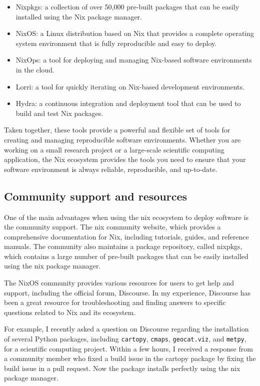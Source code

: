 \documentclass[
]{article}
\begin{document}
\begin{itemize}
\item
  Nixpkgs: a collection of over 50,000 pre-built packages that can be easily installed using the Nix package manager.
\item
  NixOS: a Linux distribution based on Nix that provides a complete operating system environment that is fully reproducible and easy to deploy.
\item
  NixOps: a tool for deploying and managing Nix-based software environments in the cloud.
\item
  Lorri: a tool for quickly iterating on Nix-based development environments.
\item
  Hydra: a continuous integration and deployment tool that can be used to build and test Nix packages.
\end{itemize}

Taken together, these tools provide a powerful and flexible set of tools for creating and managing reproducible software environments. Whether you are working on a small research project or a large-scale scientific computing application, the Nix ecosystem provides the tools you need to ensure that your software environment is always reliable, reproducible, and up-to-date.

\hypertarget{community-support-and-resources}{%
\subsection{Community support and resources}\label{community-support-and-resources}}

One of the main advantages when using the nix ecosystem to deploy software is the
community support. The nix community website, which provides a comprehensive
documentation for Nix, including tutorials, guides, and reference manuals.
The community also maintains a package repository, called nixpkgs, which contains
a large number of pre-built packages that can be easily installed using the nix
package manager.

The NixOS community provides various resources for users to get help and support,
including the official forum, Discourse. In my experience, Discourse has been a
great resource for troubleshooting and finding answers to specific questions
related to Nix and its ecosystem.

For example, I recently asked a question on Discourse regarding the installation
of several Python packages, including \texttt{cartopy}, \texttt{cmaps}, \texttt{geocat.viz}, and \texttt{metpy},
for a scientific computing project. Within a few hours, I received a response from
a community member who fixed a build issue in the cartopy package by fixing the
build issue in a pull request. Now the package installs perfectly using the nix package manager.
\end{document}
